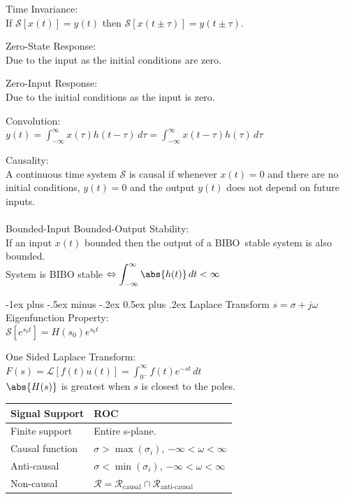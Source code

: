 \documentclass[12pt,landscape,letterpaper]{article}
\makeatletter
\renewcommand{\section}{\@startsection{section}{1}{0mm}%
                                {-1ex plus -.5ex minus -.2ex}%
                                {0.5ex plus .2ex}%
                                {\normalfont\normalsize\bfseries}}
\newcommand{\tab}{\hspace{0.02\textwidth}}
\newcommand{\ds}{\displaystyle}
\makeatother
\begin{document}
\begin{multicols*}{3}
Time Invariance:\\
\tab If $\mathcal{S}[x(t)] = y(t)$ then $\mathcal{S}[x(t \pm \tau)] = y(t \pm \tau)$.

Zero-State Response:\\
\tab Due to the input as the initial conditions are zero.

Zero-Input Response:\\
\tab Due to the initial conditions as the input is zero.

Convolution:\\
\tab $\ds y(t) = \int_{-\infty}^{\infty}x(\tau)h(t-\tau)\,d\tau = \int_{-\infty}^{\infty}x(t-\tau)h(\tau)\,d\tau$

Causality:\\
\tab A continuous time system $\mathcal{S}$ is causal if whenever $x(t) = 0$ and there are no initial conditions, $y(t) = 0$ and the output $y(t)$ does not depend on future inputs.
\\~\\
Bounded-Input Bounded-Output Stability:\\
\tab If an input $x(t)$ bounded then the output of a BIBO~stable system is also bounded.\\
\tab System is BIBO stable $\Leftrightarrow \ds \int_{-\infty}^{\infty} \abs{h(t)}\,dt < \infty$

\section{Laplace Transform}
$s = \sigma + j\omega$\\

Eigenfunction Property:\\
\tab $\mathcal{S}[e^{s_0t}] = H(s_0)e^{s_0t}$

One Sided Laplace Transform:\\
\tab $\ds F(s) = \mathcal{L}[f(t)u(t)] = \int_{0^-}^{\infty}f(t)e^{-st}\,dt$\\
\tab $\abs{H(s)}$ is greatest when $s$ is closest to the poles. %


\begin{tabular}{ll}  
	\toprule
	Signal Support & ROC\\
	\midrule
	Finite support & Entire s-plane.\\
	Causal function & $\sigma > \max(\sigma_i)$,  $-\infty < \omega < \infty$\\
	Anti-causal & $\sigma < \min(\sigma_i)$,  $-\infty < \omega < \infty$\\
	Non-causal & $\mathcal{R} = \mathcal{R}_\text{causal} \cap \mathcal{R}_\text{anti-causal}$\\
	\bottomrule
\end{tabular}
\vspace{0.5em}


\end{multicols*}
\end{document}
